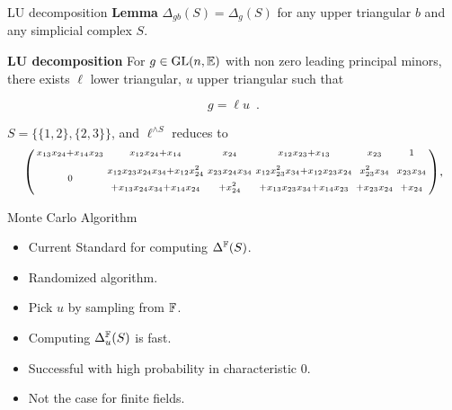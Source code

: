 \documentclass[9pt]{beamer}
\renewenvironment{lemma}[1][]
{\textcolor{LineColor}{\textbf{Lemma #1 }} }
{}
\begin{document}
\begin{frame}[fragile]{LU decomposition}
  \begin{lemma}
    $\Delta_{gb}(S) = \Delta_g(S)$ for any upper triangular $b$ and any simplicial complex $S$.
  \end{lemma}
  \vspace{8mm}

  \textbf{LU decomposition}
    For $g \in \mathrm{GL}(n, {\mathbb E})$ with non zero leading principal minors, there exists
    $\ell$ lower triangular, $u$ upper triangular such that

    \[
      g = \ell u \enspace.
    \]
    \vspace{3mm}
    \pause
    \begin{example}
      $S = \{\{1, 2\}, \{2, 3\}\}$, and  $\ell^{\wedge S} $ reduces to
      \[
        \begin{psmallmatrix}
          x_{13} x_{24} + x_{14} x_{23} & x_{12} x_{24} + x_{14}                                                                                             & x_{24}                                                        & x_{12} x_{23} + x_{13}                                                                                            & x_{23}                                                        & 1                                                  \\[3.5pt]
          0                             & \substack{x_{12} x_{23} x_{24} x_{34} + x_{12} x_{24}^{2} \strut \\ + x_{13} x_{24} x_{34} + x_{14} x_{24} \strut} & \substack{x_{23} x_{24} x_{34} \strut \\ + x_{24}^{2} \strut} & \substack{x_{12} x_{23}^{2} x_{34} + x_{12} x_{23} x_{24} \strut \\ + x_{13} x_{23} x_{34} + x_{14}x_{23} \strut} & \substack{x_{23}^{2} x_{34} \strut \\ + x_{23} x_{24} \strut} & \substack{x_{23} x_{34} \strut \\ + x_{24} \strut}
        \end{psmallmatrix},
      \]
    \end{example}
\end{frame}


\begin{frame}[fragile]{Monte Carlo Algorithm}
  \begin{itemize}
  \item Current Standard for computing $\Delta^{{\mathbb F}}(S)$.
  \item Randomized algorithm.
  \item Pick $u$ by sampling from ${\mathbb F}$.
  \item Computing $\Delta_u^{{\mathbb F}}(S)$ is fast.
  \item Successful with high probability in characteristic $0$.
  \item Not the case for finite fields.
  \end{itemize}
\end{frame}
\end{document}
